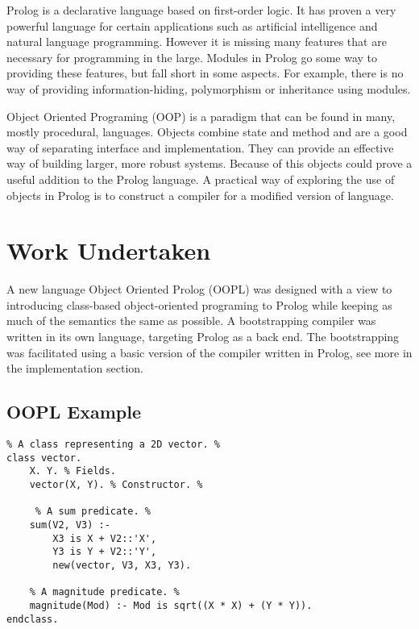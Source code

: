 \documentclass[12pt,a4paper,twoside,openright]{report}
\begin{document}
\bigskip

Prolog is a declarative language based on first-order logic. It has proven a very powerful language for certain applications such as artificial intelligence\cite{AIBOOK} and natural language programming\cite{NLPBOOK}. However it is missing many features that are necessary for programming in the large. Modules in Prolog go some way to providing these features, but fall short in some aspects. For example, there is no way of providing information-hiding, polymorphism or inheritance using modules.

\bigskip

Object Oriented Programing (OOP) is a paradigm that can be found in many, mostly procedural, languages. Objects combine state and method and are a good way of separating interface and implementation. They can provide an effective way of building larger, more robust systems. Because of this objects could prove a useful addition to the Prolog language. A practical way of exploring the use of objects in Prolog is to construct a compiler for a modified version of language.

\section{Work Undertaken}

A new language Object Oriented Prolog (OOPL) was designed with a view to introducing class-based object-oriented programing to Prolog while keeping as much of the semantics the same as possible. A bootstrapping compiler was written in its own language, targeting Prolog as a back end. The bootstrapping was facilitated using a basic version of the compiler written in Prolog, see more in the implementation section.

\subsection {OOPL Example}

\begin{lstlisting}
% A class representing a 2D vector. %
class vector. 
	X. Y. % Fields.
	vector(X, Y). % Constructor. %
	
	 % A sum predicate. %
	sum(V2, V3) :- 
		X3 is X + V2::'X',
		Y3 is Y + V2::'Y',
		new(vector, V3, X3, Y3).
		
	% A magnitude predicate. %
	magnitude(Mod) :- Mod is sqrt((X * X) + (Y * Y)). 
endclass.
\end{lstlisting}
\end{document}
